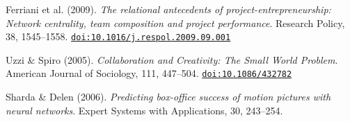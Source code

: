 \begin{enumerate}[label={[\arabic*]},start=1,leftmargin=2.2em,itemsep=2pt]
\item Ferriani et al. (2009). \textit{The relational antecedents of project-entrepreneurship: Network centrality, team composition and project performance}. Research Policy, 38, 1545--1558. \href{https://doi.org/10.1016/j.respol.2009.09.001}{\nolinkurl{doi:10.1016/j.respol.2009.09.001}} 
\item Uzzi \& Spiro (2005). \textit{Collaboration and Creativity: The Small World Problem}. American Journal of Sociology, 111, 447--504. \href{https://doi.org/10.1086/432782}{\nolinkurl{doi:10.1086/432782}} 
\item Sharda \& Delen (2006). \textit{Predicting box-office success of motion pictures with neural networks}. Expert Systems with Applications, 30, 243--254.  
\end{enumerate}
